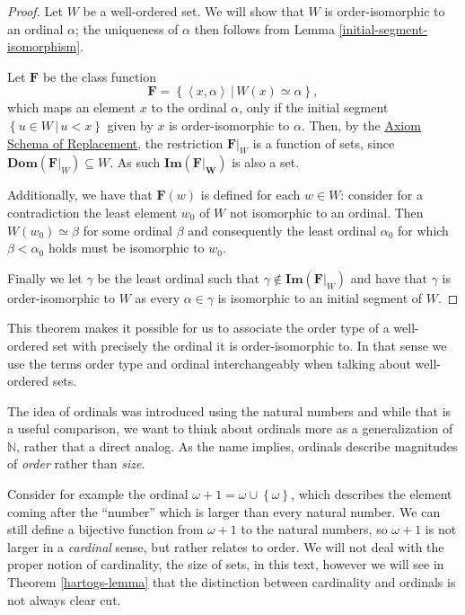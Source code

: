 \documentclass[../../main.tex]{subfiles}
\begin{document}
\begin{proof}
    Let $W$ be a well-ordered set.
    We will show that $W$ is order-isomorphic to an ordinal $\alpha$; the uniqueness of $\alpha$ then follows from Lemma \ref{initial-segment-isomorphism}.

    Let $\mathbf{F}$ be the class function
    $$\mathbf{F} = \left\{\left<x, \alpha\right> \,\vert\, W(x) \simeq \alpha\right\},$$
    which maps an element $x$ to the ordinal $\alpha$, only if the initial segment $\left\{u \in W \,\vert\, u < x\right\}$ given by $x$ is order-isomorphic to $\alpha$.
    Then, by the \hyperref[ZF8]{Axiom Schema of Replacement}, the restriction $\mathbf{F}\vert_W$ is a function of sets, since $\mathbf{Dom}(\mathbf{F}\vert_W) \subseteq W$.
    As such $\mathbf{Im}(\mathbf{F\vert_W})$ is also a set.

    Additionally, we have that $\mathbf{F}(w)$ is defined for each $w \in W$:
    consider for a contradiction the least element $w_0$ of $W$ not isomorphic to an ordinal.
    Then $W(w_0) \simeq \beta$ for some ordinal $\beta$ and consequently the least ordinal $\alpha_0$ for which $\beta < \alpha_0$ holds must be isomorphic to $w_0$.

    Finally we let $\gamma$ be the least ordinal such that $\gamma \not\in \textbf{Im}(\mathbf{F}\vert_W)$ and have that $\gamma$ is order-isomorphic to $W$ 
    as every $\alpha \in \gamma$ is isomorphic to an initial segment of $W$.
\end{proof}

This theorem makes it possible for us to associate the order type of a well-ordered set with precisely the ordinal it is order-isomorphic to.
In that sense we use the terms order type and ordinal interchangeably when talking about well-ordered sets.

The idea of ordinals was introduced using the natural numbers and while that is a useful comparison, 
we want to think about ordinals more as a generalization of $\mathbb{N}$, rather that a direct analog.
As the name implies, ordinals describe magnitudes of \textit{order} rather than \textit{size}.

Consider for example the ordinal $\omega + 1 = \omega \cup \left\{\omega\right\}$, which describes the element coming after the ``number'' which is larger than every natural number.
We can still define a bijective function from $\omega + 1$ to the natural numbers, so $\omega + 1$ is not larger in a \textit{cardinal} sense, but rather relates to order.
We will not deal with the proper notion of cardinality, the size of sets, in this text, 
however we will see in Theorem \ref{hartogs-lemma} that the distinction between cardinality and ordinals is not always clear cut.
\end{document}
